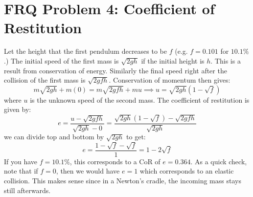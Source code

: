 \documentclass{article}
\begin{document}
\section*{FRQ Problem 4: Coefficient of Restitution}
Let the height that the first pendulum decreases to be $f$ (e.g. $f=0.101$ for $10.1\%$.) The initial speed of the first mass is $\sqrt{2gh}$ if the initial height is $h$. This is a result from conservation of energy. Similarly the final speed right after the collision of the first mass is $\sqrt{2gfh}$. Conservation of momentum then gives:
\begin{equation}
    m\sqrt{2gh}+m(0)=m\sqrt{2gfh}+mu \implies u =\sqrt{2gh}\left(1-\sqrt{f}\right)
    \label{eq:}
\end{equation}
where $u$ is the unknown speed of the second mass. The coefficient of restitution is given by:
\begin{equation}
    e = \frac{u-\sqrt{2gfh}}{\sqrt{2gh}-0} = \frac{\sqrt{2gh}\left(1-\sqrt{f}\right)-\sqrt{2gfh}}{\sqrt{2gh}}
    \label{eq:}
\end{equation}
we can divide top and bottom by $\sqrt{2gh}$ to get:
\begin{equation}
    e = \frac{1-\sqrt{f}-\sqrt{f}}{1} = 1-2\sqrt{f}
    \label{eq:}
\end{equation}
If you have $f=10.1\%$, this corresponds to a CoR of $e=0.364$. As a quick check, note that if $f=0$, then we would have $e=1$ which corresponds to an elastic collision. This makes sense since in a Newton's cradle, the incoming mass stays still afterwards.
\end{document}
